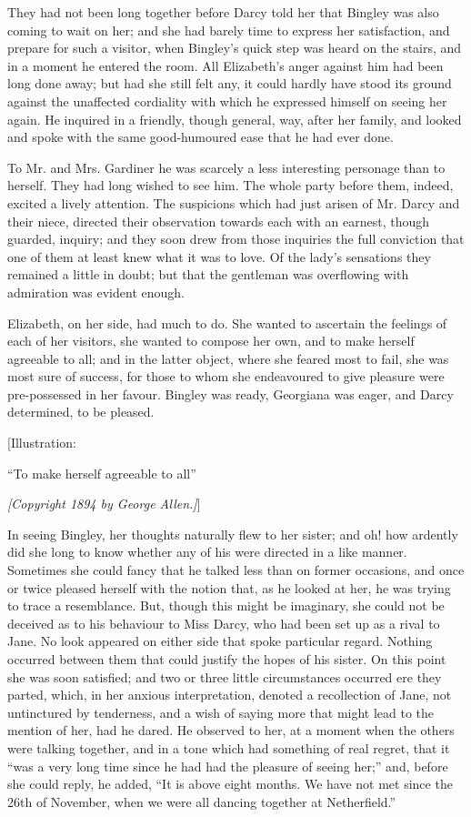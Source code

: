 \documentclass[12pt]{book}
\begin{document}
They had not been long together before Darcy told her that Bingley was also coming to wait on her; and she had barely time to express her satisfaction, and prepare for such a visitor, when Bingley's quick step was heard on the stairs, and in a moment he entered the room. All Elizabeth's anger against him had been long done away; but had she still felt any, it could hardly have stood its ground against the unaffected cordiality with which he expressed himself on seeing her again. He inquired in a friendly, though general, way, after her family, and looked and spoke with the same good-humoured ease that he had ever done.

To Mr. and Mrs. Gardiner he was scarcely a less interesting personage than to herself. They had long wished to see him. The whole party before them, indeed, excited a lively attention. The suspicions which had just arisen of Mr. Darcy and their niece, directed their observation towards each with an earnest, though guarded, inquiry; and they soon drew from those inquiries the full conviction that one of them at least knew what it was to love. Of the lady's sensations they remained a little in doubt; but that the gentleman was overflowing with admiration was evident enough.

Elizabeth, on her side, had much to do. She wanted to ascertain the feelings of each of her visitors, she wanted to compose her own, and to make herself agreeable to all; and in the latter object, where she feared most to fail, she was most sure of success, for those to whom she endeavoured to give pleasure were pre-possessed in her favour. Bingley was ready, Georgiana was eager, and Darcy determined, to be pleased.

[Illustration:

``To make herself agreeable to all''

\emph{[\textit{Copyright 1894 by George Allen.}]}]

In seeing Bingley, her thoughts naturally flew to her sister; and oh! how ardently did she long to know whether any of his were directed in a like manner. Sometimes she could fancy that he talked less than on former occasions, and once or twice pleased herself with the notion that, as he looked at her, he was trying to trace a resemblance. But, though this might be imaginary, she could not be deceived as to his behaviour to Miss Darcy, who had been set up as a rival to Jane. No look appeared on either side that spoke particular regard. Nothing occurred between them that could justify the hopes of his sister. On this point she was soon satisfied; and two or three little circumstances occurred ere they parted, which, in her anxious interpretation, denoted a recollection of Jane, not untinctured by tenderness, and a wish of saying more that might lead to the mention of her, had he dared. He observed to her, at a moment when the others were talking together, and in a tone which had something of real regret, that it ``was a very long time since he had had the pleasure of seeing her;'' and, before she could reply, he added, ``It is above eight months. We have not met since the 26th of November, when we were all dancing together at Netherfield.''
\end{document}

